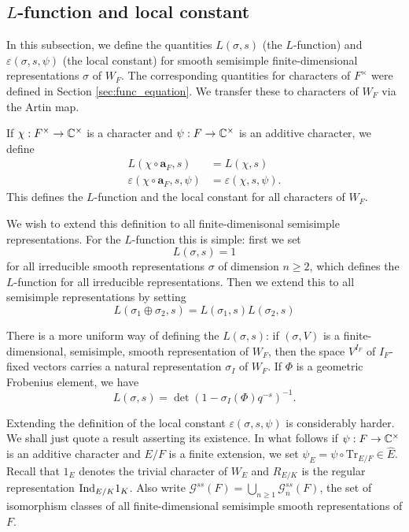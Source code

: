 \subsection{$L$-function and local constant}
In this subsection, we define the quantities $L(\sigma, s)$ (the $L$-function) and $\varepsilon(\sigma, s, \psi)$ (the local constant) for smooth semisimple finite-dimensional representations $\sigma$ of $W_F$. The corresponding quantities for characters of $F^\times$ were defined in Section \ref{sec:func_equation}. We transfer these to characters of $W_F$ via the Artin map.
\begin{defn}
	If $\chi: F^\times \to \mathbb{C}^\times$ is a character and $\psi: F\to \mathbb{C}^\times$ is an additive character, we define
	\begin{align*}
		L(\chi\circ\mathbf{a}_F, s) &= L(\chi, s)\\
		\varepsilon(\chi\circ\mathbf{a}_F, s, \psi) &= \varepsilon(\chi, s, \psi).
	\end{align*}
	This defines the $L$-function and the local constant for all characters of $W_F$.
\end{defn}
We wish to extend this definition to all finite-dimenisonal semisimple representations. For the $L$-function this is simple: first we set
\[L(\sigma, s) = 1\]
for all irreducible smooth representations $\sigma$ of dimension $n\ge 2$, which defines the $L$-function for all irreducible representations. Then we extend this to all semisimple representations by setting
\[L(\sigma_1\oplus \sigma_2, s) = L(\sigma_1, s)L(\sigma_2, s)\]
\begin{rem}
	There is a more uniform way of defining the $L(\sigma, s)$: if $(\sigma, V)$ is a finite-dimensional, semisimple, smooth representation of $W_F$, then the space $V^{I_F}$ of $I_F$-fixed vectors carries a natural representation $\sigma_{I}$ of $W_F$. If $\Phi$ is a geometric Frobenius element, we have
	\[L(\sigma, s) = \det(1 - \sigma_I(\Phi)q^{-s})^{-1}.\] 
\end{rem}
Extending the definition of the local constant $\varepsilon(\sigma, s, \psi)$ is considerably harder. We shall just quote a result asserting its existence. In what follows if $\psi: F\to \mathbb{C}^\times$ is an additive character and $E/F$ is a finite extension, we set $\psi_E = \psi \circ \mathrm{Tr}_{E/F}\in \widehat{E}$. Recall that $1_E$ denotes the trivial character of $W_E$ and $R_{E/K}$ is the regular representation $\mathrm{Ind}_{E/K} 1_K$. Also write $\mathcal{G}^{ss}(F) = \bigcup_{n\ge 1} \mathcal{G}^{ss}_n(F)$, the set of isomorphism classes of all finite-dimensional semisimple smooth representations of $F$.
